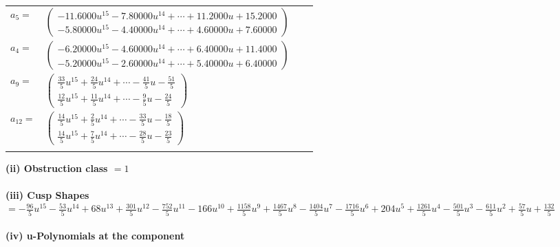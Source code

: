 \documentclass[1p]{elsarticle_modified}
\theoremstyle{definition}
\begin{document}
\begin{tabular}{m{7pt} m{180pt} m{7pt} m{180pt} }
\flushright $a_{5}=$&$\begin{pmatrix}-11.6000 u^{15}-7.80000 u^{14}+\cdots+11.2000 u+15.2000\\-5.80000 u^{15}-4.40000 u^{14}+\cdots+4.60000 u+7.60000\end{pmatrix}$ \\
\flushright $a_{4}=$&$\begin{pmatrix}-6.20000 u^{15}-4.60000 u^{14}+\cdots+6.40000 u+11.4000\\-5.20000 u^{15}-2.60000 u^{14}+\cdots+5.40000 u+6.40000\end{pmatrix}$ \\
\flushright $a_{9}=$&$\begin{pmatrix}\frac{33}{5} u^{15}+\frac{24}{5} u^{14}+\cdots-\frac{41}{5} u-\frac{51}{5}\\\frac{12}{5} u^{15}+\frac{11}{5} u^{14}+\cdots-\frac{9}{5} u-\frac{24}{5}\end{pmatrix}$ \\
\flushright $a_{12}=$&$\begin{pmatrix}\frac{14}{5} u^{15}+\frac{2}{5} u^{14}+\cdots-\frac{33}{5} u-\frac{18}{5}\\\frac{14}{5} u^{15}+\frac{7}{5} u^{14}+\cdots-\frac{28}{5} u-\frac{23}{5}\end{pmatrix}$\\&\end{tabular}
\flushleft \textbf{(ii) Obstruction class $= 1$}\\~\\
\flushleft \textbf{(iii) Cusp Shapes $= -\frac{96}{5} u^{15}-\frac{53}{5} u^{14}+68 u^{13}+\frac{301}{5} u^{12}-\frac{752}{5} u^{11}-166 u^{10}+\frac{1158}{5} u^9+\frac{1467}{5} u^8-\frac{1404}{5} u^7-\frac{1716}{5} u^6+204 u^5+\frac{1261}{5} u^4-\frac{501}{5} u^3-\frac{611}{5} u^2+\frac{57}{5} u+\frac{132}{5}$}\\~\\
\newpage\renewcommand{\arraystretch}{1}
\flushleft \textbf{(iv) u-Polynomials at the component}\newline \\
\end{document}
